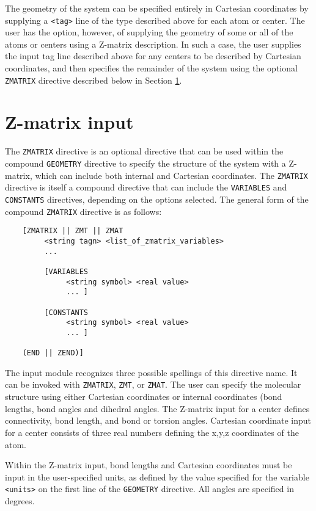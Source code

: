 The geometry of the system can be specified entirely in Cartesian
coordinates by supplying a \verb+<tag>+ line of the type described
above for each atom or center.  The user has the option, however, of
supplying the geometry of some or all of the atoms or centers using a
Z-matrix description.  In such a case, the user supplies the input tag
line described above for any centers to be described by Cartesian
coordinates, and then specifies the remainder of the system using the
optional \verb+ZMATRIX+ directive described below in Section
\ref{sec:Z-matrix}.

\section{Z-matrix input}
\label{sec:Z-matrix}

The \verb+ZMATRIX+ directive is an optional directive that can be used
within the compound \verb+GEOMETRY+ directive to specify the structure
of the system with a Z-matrix, which can include both internal and
Cartesian coordinates.  The \verb+ZMATRIX+ directive is itself a
compound directive that can include the \verb+VARIABLES+ and
\verb+CONSTANTS+ directives, depending on the options selected.  The
general form of the compound \verb+ZMATRIX+ directive is as follows:
\begin{verbatim}
    [ZMATRIX || ZMT || ZMAT
         <string tagn> <list_of_zmatrix_variables> 
         ... 

         [VARIABLES
              <string symbol> <real value>
              ... ]
 
         [CONSTANTS
              <string symbol> <real value>
              ... ]

    (END || ZEND)]
\end{verbatim}

The input module recognizes three possible spellings of this directive
name.  It can be invoked with \verb+ZMATRIX+, \verb+ZMT+, or
\verb+ZMAT+.  The user can specify the molecular structure using
either Cartesian coordinates or
internal coordinates (bond lengths, bond angles and dihedral angles.
The Z-matrix input for a center defines connectivity, bond length, and
bond or torsion angles.  Cartesian coordinate input for a center
consists of three real numbers defining the x,y,z coordinates of the
atom.

Within the Z-matrix input, bond lengths and Cartesian coordinates must
be input in the user-specified units, as defined by the value specified
for the variable \verb+<units>+ on the first line of the \verb+GEOMETRY+
directive.  All angles are specified in
degrees.

